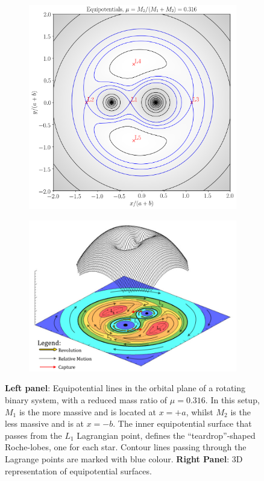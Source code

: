 \begin{figure}[h]
   \centering
\begin{subfigure}[h]{0.45\textwidth}
	\centering
   	 \includegraphics[width = \linewidth]{Figures/equipotentials_mu_0_316.png} 
\end{subfigure}
\begin{subfigure}[h]{0.535\textwidth}
	\centering
	\includegraphics[width = \linewidth]{Figures/RochePotential_-_Colorized.png} 
    \end{subfigure}
    \caption{\textbf{Left panel}: Equipotential lines in the orbital plane of a rotating binary system, with a reduced mass ratio of $\mu = 0.316$. In this setup, $M_1$ is the more massive and is located at $x = +a$, whilst $M_2$ is the less massive and is at $x = -b$. The inner equipotential surface that passes from the $L_1$ Lagrangian point, defines the ``teardrop''-shaped Roche-lobes, one for each star. Contour lines passing through the Lagrange points are marked with blue colour. \textbf{Right Panel}: 3D representation of equipotential surfaces.}
    \label{fig:eq_sur}
\end{figure}

